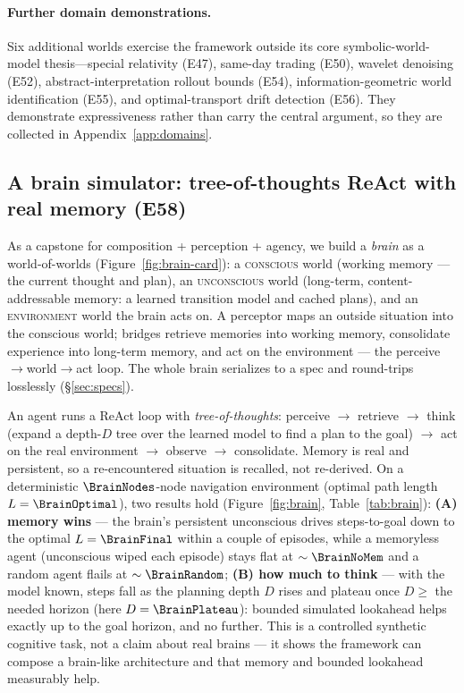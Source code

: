 \documentclass[11pt]{article}
\begin{document}
\begin{table}[htb]
\centering
\caption{\textbf{E51 startup batch}: causal value-of-factor (PMF $\gg$ capital)
and the power law of outcomes.}
\label{tab:startups}

\end{table}

\paragraph{Further domain demonstrations.} Six additional worlds exercise the framework outside its core symbolic-world-model thesis---special relativity (E47), same-day trading (E50), wavelet denoising (E52), abstract-interpretation rollout bounds (E54), information-geometric world identification (E55), and optimal-transport drift detection (E56). They demonstrate expressiveness rather than carry the central argument, so they are collected in Appendix~\ref{app:domains}.

\subsection{A brain simulator: tree-of-thoughts ReAct with real memory (E58)}\label{sec:brain}
As a capstone for composition + perception + agency, we build a \emph{brain} as a
world-of-worlds (Figure~\ref{fig:brain-card}): a \textsc{conscious} world (working
memory --- the current thought and plan), an \textsc{unconscious} world (long-term,
content-addressable memory: a learned transition model and cached plans), and an
\textsc{environment} world the brain acts on. A perceptor maps an outside situation
into the conscious world; bridges retrieve memories into working memory,
consolidate experience into long-term memory, and act on the
environment --- the perceive$\to$world$\to$act loop. The whole brain serializes to a
spec and round-trips losslessly (\S\ref{sec:specs}).

An agent runs a ReAct loop with \emph{tree-of-thoughts}: perceive $\to$ retrieve
$\to$ think (expand a depth-$D$ tree over the learned model to find a plan to
the goal) $\to$ act on the real environment $\to$ observe $\to$ consolidate. Memory
is real and persistent, so a re-encountered situation is recalled, not re-derived.
On a deterministic $\BrainNodes$-node navigation environment (optimal path length
$L=\BrainOptimal$), two results hold (Figure~\ref{fig:brain}, Table~\ref{tab:brain}):
\textbf{(A) memory wins} --- the brain's persistent unconscious drives steps-to-goal
down to the optimal $L=\BrainFinal$ within a couple of episodes, while a memoryless
agent (unconscious wiped each episode) stays flat at $\sim\BrainNoMem$ and a random
agent flails at $\sim\BrainRandom$; \textbf{(B) how much to think} --- with the model
known, steps fall as the planning depth $D$ rises and plateau once
$D\!\geq\!$ the needed horizon (here $D=\BrainPlateau$): bounded simulated lookahead
helps exactly up to the goal horizon, and no further. This is a controlled synthetic
cognitive task, not a claim about real brains --- it shows the framework can compose
a brain-like architecture and that memory and bounded lookahead measurably help.
\end{document}
